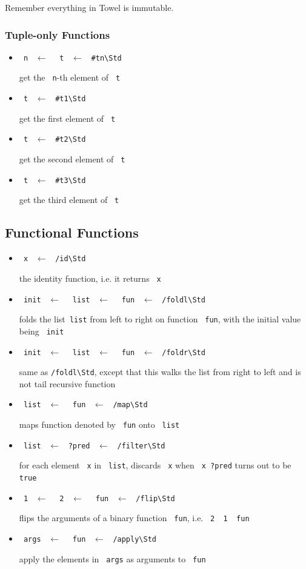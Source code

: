 \documentclass{report}
\newcommand{\mstd}[1]{\texttt{#1\textbackslash Std}}
\newcommand{\mtilde}[1]{\textasciitilde}
\newcommand{\marg}[1]{\texttt{\mtilde ~#1}}
\newcommand{\mla}[0]{~$\leftarrow$ ~}
\begin{document}
\begin{mdframed}[style=hint]
  Remember everything in Towel is immutable.
\end{mdframed}

\subsubsection{Tuple-only Functions}

\begin{itemize}
\item \marg{n} \mla \marg{t} \mla \mstd{\#tn}

get the \marg{n}-th element of \marg{t}
\item \marg{t} \mla \mstd{\#t1}

get the first element of \marg{t}
\item \marg{t} \mla \mstd{\#t2}

get the second element of \marg{t}
\item \marg{t} \mla \mstd{\#t3}

get the third element of \marg{t}
\end{itemize}

\subsection{Functional Functions}

\begin{itemize}
\item \marg{x} \mla \mstd{/id}

the identity function, i.e. it returns \marg{x}
\item \marg{init} \mla \marg{list} \mla \marg{fun} \mla \mstd{/foldl}

folds the  list\marg{list} from left to right on function \marg{fun}, with the initial value being \marg{init}
\item \marg{init} \mla \marg{list} \mla \marg{fun} \mla \mstd{/foldr}

same as \mstd{/foldl}, except that this walks the list from right to left and is not tail recursive function
\item \marg{list} \mla \marg{fun} \mla \mstd{/map}

maps function denoted by \marg{fun} onto \marg{list}
\item \marg{list} \mla \texttt{?pred} \mla \mstd{/filter}

for each element \marg{x} in \marg{list}, discards \marg{x} when \texttt{\marg{x} ?pred} turns out to be \texttt{true}
\item \marg1 \mla \marg2 \mla \marg{fun} \mla \mstd{/flip}

flips the arguments of a binary function \marg{fun}, i.e. \texttt{\marg2 \marg1 \marg{fun}}
\item \marg{args} \mla \marg{fun} \mla \mstd{/apply}

apply the elements in \marg{args} as arguments to \marg{fun}
\end{itemize}
\end{document}

